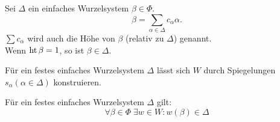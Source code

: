 \documentclass{article}
\begin{document}
\begin{defi}
    Sei \( \Delta \) ein einfaches Wurzelsystem 
    \( \beta \in \Phi \).
    \[ \beta = \sum_{\alpha \in \Delta} c_\alpha \alpha. \]
    \( \sum c_\alpha \) wird auch die Höhe von \( \beta \) 
    (relativ zu \( \Delta \)) genannt.\\
    Wenn \( \operatorname{ht} \beta = 1 \), so ist \( \beta \in \Delta \).
\end{defi}

\begin{satz}
    Für ein festes einfaches Wurzelsystem \( \Delta \) lässt 
    sich \( W \) durch Spiegelungen \( s_\alpha 
    (\alpha \in \Delta) \) konstruieren.
\end{satz}

\begin{kor}
    Für ein festes einfaches Wurzelsystem \( \Delta \) 
    gilt:
    \[ \forall \beta \in \Phi \; \exists w \in W: 
    w(\beta) \in \Delta \]
\end{kor}
\end{document}
